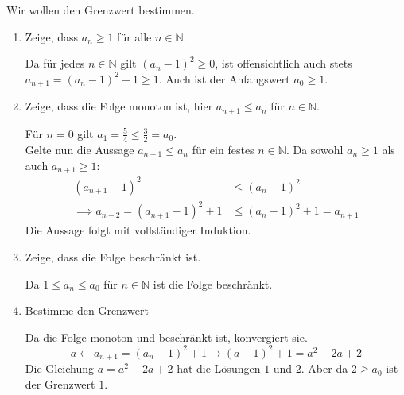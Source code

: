 \documentclass[10pt,a4paper]{article}
\begin{document}
\begin{minipage}{0.5\textwidth}
Wir wollen den Grenzwert bestimmen.\\

\begin{enumerate}[label=\alph*.]
	\item Zeige, dass $a_n\ge1$ für alle $n\in\mathbb{N}$.

		Da für jedes $n\in\mathbb{N}$ gilt $(a_n-1)^2\ge0$, ist offensichtlich auch stets $a_{n+1}=(a_n-1)^2+1 \ge 1$.
		Auch ist der Anfangswert $a_0\ge1$.

	\item Zeige, dass die Folge monoton ist, hier $a_{n+1}\le a_n$ für $n\in\mathbb{N}$.

		Für $n=0$ gilt $a_1=\frac{5}{4} \le \frac{3}{2}=a_0$.\\
		Gelte nun die Aussage $a_{n+1}\le a_n$ für ein festes $n\in\mathbb{N}$.
		Da sowohl $a_n\ge1$ als auch $a_{n+1}\ge1$:
		\begin{align*}
			(a_{n+1}-1)^2 &\le (a_n-1)^2 \\
			\implies a_{n+2}=(a_{n+1}-1)^2+1 &\le (a_n - 1)^2+1=a_{n+1}
		\end{align*}
		Die Aussage folgt mit vollständiger Induktion.

	\item Zeige, dass die Folge beschränkt ist.

		Da $1\le a_n \le a_0$ für $n\in\mathbb{N}$ ist die Folge beschränkt.

	\item Bestimme den Grenzwert

		Da die Folge monoton und beschränkt ist, konvergiert sie.\\
		\[a \longleftarrow a_{n+1}=(a_n-1)^2+1 \longrightarrow (a-1)^2+1=a^2-2a+2\]
		Die Gleichung $a=a^2-2a+2$ hat die Lösungen $1$ und $2$.
		Aber da $2\ge a_0$ ist der Grenzwert $1$.
\end{enumerate}

\end{minipage}
\end{document}
